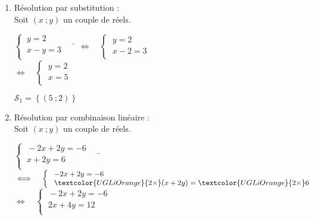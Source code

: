 \documentclass[a4paper,11pt,exos]{nsi} %
\begin{document}
\begin{enumerate}
    \item Résolution par substitution :\\
    Soit $(x\ ;y)$ un couple de réels.
        \begin{tabbing}
            $\left\{
                \begin{array}{l}
                    \ y=2 \\
				    \ x-y=3 \\
                \end{array} \right. \quad$  \= $\iff\quad 
                \left\{
                    \begin{array}{l}
                        \ y=2 \\
                        \ x-2=3 \\
                \end{array} \right.$\\[.5em]
    
                \>  $\iff\quad \left\{
                    \begin{array}{l}
                        \ y=2 \\
                        \ x=5 \\
                \end{array} \right.$
        \end{tabbing}
        $\mathcal{S}_1=\left\{\left(5\ ;2\right)\right\}$

    \item Résolution par combinaison linéaire :\\
    Soit $(x\ ;y)$ un couple de réels.
        \begin{tabbing}
            $\left\{
                \begin{array}{l}
                    \ -2x+2y=-6 \\
				    \ x+2y=6 \\
                \end{array} \right. \quad$  \= $\iff\quad 
                \left\{
                    \begin{array}{l}
                        \ -2x+2y=-6 \\
				        \ \textcolor{UGLiOrange}{2\times}(x+2y)=\textcolor{UGLiOrange}{2\times}6 \\
                \end{array} \right.$\\[.5em]
    
                \>  $\iff\quad \left\{
                    \begin{array}{l}
                        \ -2x+2y=-6 \\
                        \ 2x+4y=12 \\
                \end{array} \right.$\\[.5em]


\end{tabbing}
\end{enumerate}
\end{document}
